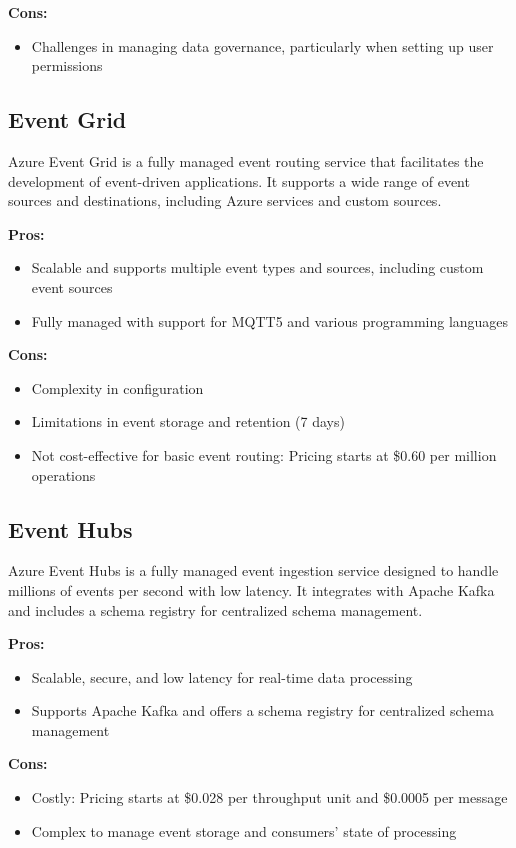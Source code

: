 \textbf{Cons:}
\begin{itemize}
    \item Challenges in managing data governance, particularly when setting up user permissions
\end{itemize}

\subsection*{Event Grid}
\label{azure:event-grid}
Azure Event Grid is a fully managed event routing service that facilitates the development of event-driven applications. It supports a wide range of event sources and destinations, including Azure services and custom sources.

\textbf{Pros:}
\begin{itemize}
    \item Scalable and supports multiple event types and sources, including custom event sources
    \item Fully managed with support for MQTT5 and various programming languages
\end{itemize}

\textbf{Cons:}
\begin{itemize}
    \item Complexity in configuration
    \item Limitations in event storage and retention (7 days)
    \item Not cost-effective for basic event routing: Pricing starts at \$0.60 per million operations
\end{itemize}

\subsection*{Event Hubs}
\label{azure:event-hubs}
Azure Event Hubs is a fully managed event ingestion service designed to handle millions of events per second with low latency. It integrates with Apache Kafka and includes a schema registry for centralized schema management.

\textbf{Pros:}
\begin{itemize}
    \item Scalable, secure, and low latency for real-time data processing
    \item Supports Apache Kafka and offers a schema registry for centralized schema management
\end{itemize}

\textbf{Cons:}
\begin{itemize}
    \item Costly: Pricing starts at \$0.028 per throughput unit and \$0.0005 per message
    \item Complex to manage event storage and consumers' state of processing
\end{itemize}

